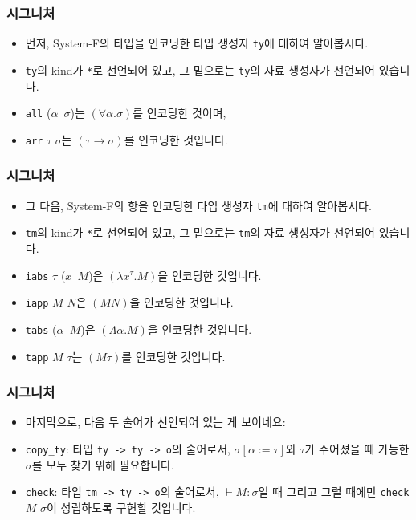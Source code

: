 \documentclass[slidestop,compress,mathserif]{beamer}
\begin{document}
    \begin{frame}
        \frametitle{시그니처}
        \begin{itemize}
            \item 먼저, System-F의 타입을 인코딩한 타입 생성자 \texttt{ty}에 대하여 알아봅시다.
            \item \texttt{ty}의 kind가 \texttt{*}로 선언되어 있고, 그 밑으로는 \texttt{ty}의 자료 생성자가 선언되어 있습니다.
            \item \texttt{all} ($\alpha$\texttt{\string\ }$\sigma$)는 $\left( \forall \alpha . \sigma \right)$를 인코딩한 것이며,
            \item \texttt{arr} $\tau$ $\sigma$는 $\left( \tau \to \sigma \right)$를 인코딩한 것입니다.
        \end{itemize}
    \end{frame}

    \begin{frame}
        \frametitle{시그니처}
        \begin{itemize}
            \item 그 다음, System-F의 항을 인코딩한 타입 생성자 \texttt{tm}에 대하여 알아봅시다.
            \item \texttt{tm}의 kind가 \texttt{*}로 선언되어 있고, 그 밑으로는 \texttt{tm}의 자료 생성자가 선언되어 있습니다.
            \item \texttt{iabs} $\tau$ ($x$\texttt{\string\ }$M$)은 $\left( \lambda x^{\tau} . M \right)$을 인코딩한 것입니다.
            \item \texttt{iapp} $M$ $N$은 $\left( M N \right)$을 인코딩한 것입니다.
            \item \texttt{tabs} ($\alpha$\texttt{\string\ }$M$)은 $\left( \Lambda \alpha . M \right)$을 인코딩한 것입니다.
            \item \texttt{tapp} $M$ $\tau$는 $\left( M \tau \right)$를 인코딩한 것입니다.
        \end{itemize}
    \end{frame}

    \begin{frame}
        \frametitle{시그니처}
        \begin{itemize}
            \item 마지막으로, 다음 두 술어가 선언되어 있는 게 보이네요:
            \item \texttt{copy\_ty}: 타입 \texttt{ty -> ty -> o}의 술어로서, $\sigma \left[ \alpha := \tau \right]$와 $\tau$가 주어졌을 때 가능한 $\sigma$를 모두 찾기 위해 필요합니다.
            \item \texttt{check}: 타입 \texttt{tm -> ty -> o}의 술어로서, $\vdash M : \sigma$일 때 그리고 그럴 때에만 \texttt{check} $M$ $\sigma$이 성립하도록 구현할 것입니다.
        \end{itemize}
    \end{frame}
\end{document}
